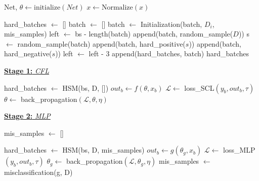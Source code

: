 \documentclass[lettersize,journal]{IEEEtran}
\begin{document}
\begin{algorithm}[htb]%
\caption{Hard sample mining enabled contrastive feature learning for wind turbine pitch system fault diagnosis}

\label{hsmsclalgorithm}


Net, $\theta \leftarrow \text{initialize}(Net)$\;
$x \leftarrow \text{Normalize}(x)$\;

{
    hard\_batches $\leftarrow$ []\;
    {
        batch $\leftarrow$ []\;
        batch $\leftarrow$ Initialization(batch, $D_i$, mis\_samples)\;
        left $\leftarrow$ bs - length(batch)\;
        {
            append(batch, random\_sample($D$))\;
            s $\leftarrow$ random\_sample(batch)\;
            append(batch, hard\_positive($s$))\;
            append(batch, hard\_negative($s$))\;
            left $\leftarrow$ left - 3\;
        }
        append(hard\_batches, batch)\;
    }
    \Return hard\_batches\;
}

\underline{\textbf{Stage 1:} \textit{CFL}}

{
    hard\_batches $\leftarrow$ HSM(bs, D, [])\;
    {
        {
            $out_{b} \leftarrow f(\theta, x_{b})$\;
            $\mathcal{L} \leftarrow$ loss\_SCL$(y_b, out_b, \tau)$\;
            $\theta \leftarrow$ back\_propagation$(\mathcal{L}, \theta, \eta)$\;
        }
    }
}

\underline{\textbf{Stage 2:} \textit{MLP}}

mis\_samples $\leftarrow$ []\;

{
    hard\_batches $\leftarrow$ HSM(bs, D, mis\_samples)\;
    {
        {
            $out_{b} \leftarrow g(\theta_g, x_{b})$\;
            $\mathcal{L} \leftarrow$ loss\_MLP$(y_b, out_b, \tau)$\;
            $\theta_g \leftarrow$ back\_propagation$(\mathcal{L}, \theta_g, \eta)$\;
        }
    }
    mis\_samples $\leftarrow$ misclassification(g, D)\;
}
\end{algorithm}
\end{document}
